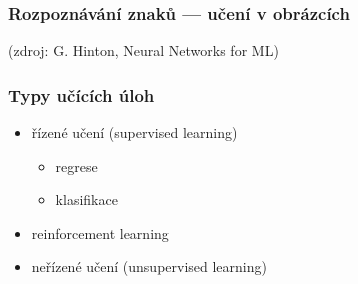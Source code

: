 \documentclass[red,professionalfont]{beamer}
\theoremstyle{definition}
\newcommand{\0}{\mbox{${\bf 0}$}}
\begin{document}
\begin{frame}\frametitle{Rozpoznávání znaků --- učení v obrázcích}
\begin{center}
\end{center}
\begin{center}
  {\tiny(zdroj: G. Hinton, Neural Networks for ML)}
\end{center}


\end{frame}


\begin{frame}\frametitle{Typy učících úloh}
\begin{itemize}
 \item řízené učení (supervised learning)\pause
    \begin{itemize}
      \item regrese\pause
      \item klasifikace\pause
    \end{itemize}
 \item reinforcement learning\pause
 \item neřízené učení (unsupervised learning)
\end{itemize}
\end{frame}
\end{document}
